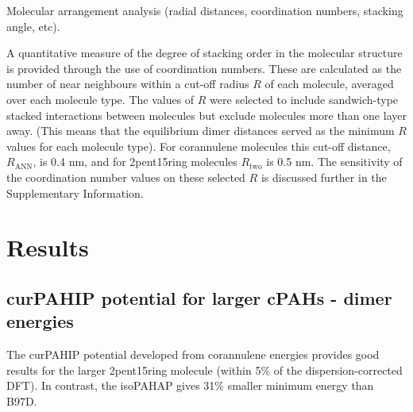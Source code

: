 Molecular arrangement analysis (radial distances, coordination numbers, stacking angle, etc).

A quantitative measure of the degree of stacking order in the molecular structure is provided through the use of coordination numbers. These are calculated as the number of near neighbours within a cut-off radius $R$ of each molecule, averaged over each molecule type. The values of $R$ were selected to include sandwich-type stacked interactions between molecules but exclude molecules more than one layer away. (This means that the equilibrium dimer distances served as the minimum $R$ values for each molecule type). For corannulene molecules this cut-off distance, $R_{\text{ANN}}$, is 0.4 nm, and for 2pent15ring molecules $R_{\text{two}}$ is 0.5 nm.  The sensitivity of the coordination number values on these selected $R$ is discussed further in the Supplementary Information.


\section{Results}
\subsection{curPAHIP potential for larger cPAHs - dimer energies}
The curPAHIP potential developed from corannulene energies provides good results for the larger 2pent15ring molecule (within 5\% of the dispersion-corrected DFT). In contrast, the isoPAHAP gives 31\% smaller minimum energy than B97D.


